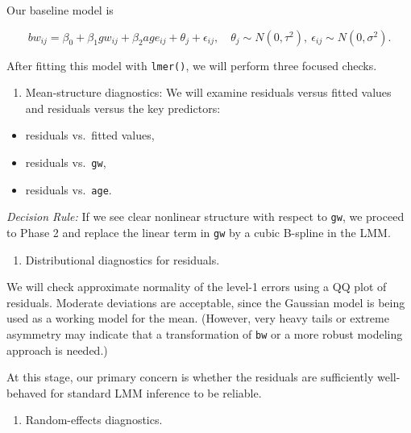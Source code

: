 \documentclass[
  letterpaper,
  DIV=11,
  numbers=noendperiod]{scrreprt}
\providecommand{\tightlist}{%
  \setlength{\itemsep}{0pt}\setlength{\parskip}{0pt}}\usepackage{longtable,booktabs,array}
\begin{document}
Our baseline model is

\[
bw_{ij} = \beta_0 + \beta_1 gw_{ij} + \beta_2 age_{ij} + \theta_j + \epsilon_{ij},
\quad \theta_j \sim N(0, \tau^2), \ \epsilon_{ij} \sim N(0, \sigma^2).
\]

After fitting this model with \texttt{lmer()}, we will perform three
focused checks.

\begin{enumerate}
\def\labelenumi{\arabic{enumi}.}
\tightlist
\item
  Mean-structure diagnostics: We will examine residuals versus fitted
  values and residuals versus the key predictors:
\end{enumerate}

\begin{itemize}
\tightlist
\item
  residuals vs.~fitted values,\\
\item
  residuals vs.~\texttt{gw},\\
\item
  residuals vs.~\texttt{age}.
\end{itemize}

\emph{Decision Rule:} If we see clear nonlinear structure with respect
to \texttt{gw}, we proceed to Phase 2 and replace the linear term in
\texttt{gw} by a cubic B-spline in the LMM.

\begin{enumerate}
\def\labelenumi{\arabic{enumi}.}
\setcounter{enumi}{1}
\tightlist
\item
  Distributional diagnostics for residuals.
\end{enumerate}

We will check approximate normality of the level-1 errors using a QQ
plot of residuals. Moderate deviations are acceptable, since the
Gaussian model is being used as a working model for the mean. (However,
very heavy tails or extreme asymmetry may indicate that a transformation
of \texttt{bw} or a more robust modeling approach is needed.)

At this stage, our primary concern is whether the residuals are
sufficiently well-behaved for standard LMM inference to be reliable.

\begin{enumerate}
\def\labelenumi{\arabic{enumi}.}
\setcounter{enumi}{2}
\tightlist
\item
  Random-effects diagnostics.
\end{enumerate}
\end{document}
